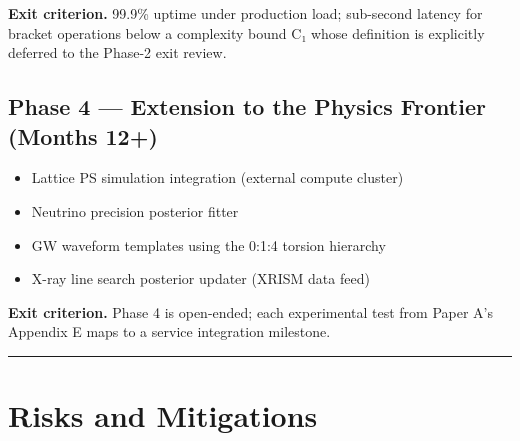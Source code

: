 \documentclass[11pt,a4paper]{article}
\providecommand{\tightlist}{\setlength{\itemsep}{0pt}\setlength{\parskip}{0pt}}
\begin{document}
\textbf{Exit criterion.} 99.9\% uptime under production load; sub-second
latency for bracket operations below a complexity bound C₁ whose
definition is explicitly deferred to the Phase-2 exit review.

\hypertarget{phase-4-extension-to-the-physics-frontier-months-12}{%
\subsection{Phase 4 --- Extension to the Physics Frontier (Months
12+)}\label{phase-4-extension-to-the-physics-frontier-months-12}}

\begin{itemize}
\tightlist
\item
  Lattice PS simulation integration (external compute cluster)
\item
  Neutrino precision posterior fitter
\item
  GW waveform templates using the 0:1:4 torsion hierarchy
\item
  X-ray line search posterior updater (XRISM data feed)
\end{itemize}

\textbf{Exit criterion.} Phase 4 is open-ended; each experimental test
from Paper A's Appendix E maps to a service integration milestone.

\begin{center}\rule{0.5\linewidth}{0.5pt}\end{center}

\hypertarget{risks-and-mitigations}{%
\section{Risks and Mitigations}\label{risks-and-mitigations}}
\end{document}

